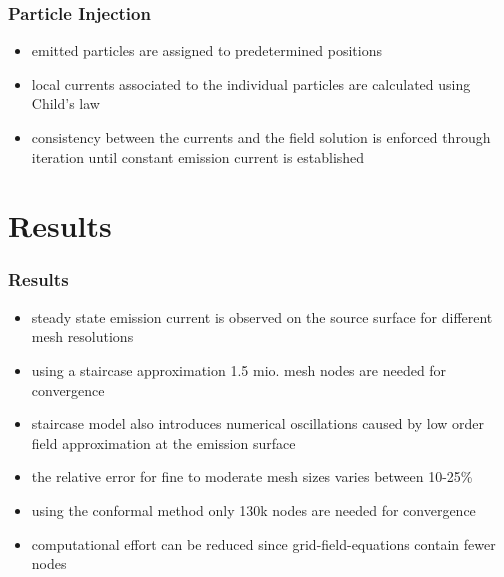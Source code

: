 \documentclass[colorbacktitle,inverttitle,landscape,presentation,
	english,
	aspectratio=43, %
	accentcolor=tud9b, %
]{tudbeamer}
\begin{document}
\begin{frame}
\frametitle{Particle Injection}
	\begin{itemize}
	\item emitted particles are assigned to predetermined positions
	
	\item local currents associated to the individual particles are calculated using Child's law
	
	\item consistency between the currents and the field solution is enforced through iteration until constant emission current is established
	\end{itemize}
\end{frame}


\section{Results}
\begin{frame}
\frametitle{Results}
	\begin{itemize}
	\item steady state emission current is observed on the source surface for different mesh resolutions
	
	\item using a staircase approximation 1.5 mio. mesh nodes are needed for convergence
	
	\item staircase model also introduces numerical oscillations caused by low order field approximation at the emission surface
	
	\item the relative error for fine to moderate mesh sizes varies between 10-25\%
	
	\item using the conformal method only 130k nodes are needed for convergence
	
	\item computational effort can be reduced since grid-field-equations contain fewer nodes
	\end{itemize}
\end{frame}

\end{document}
